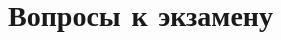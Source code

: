 \documentclass[a4paper]{article}
\begin{document}
  

  \section{Вопросы к экзамену}
\end{document}
